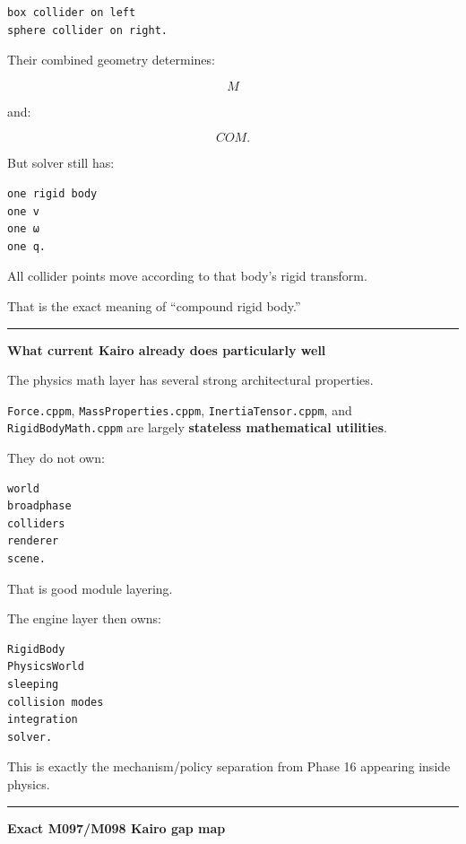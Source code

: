 \begin{verbatim}
box collider on left
sphere collider on right.
\end{verbatim}

Their combined geometry determines:

\[
M
\]

and:

\[
COM.
\]

But solver still has:

\begin{verbatim}
one rigid body
one v
one ω
one q.
\end{verbatim}

All collider points move according to that body's rigid transform.

That is the exact meaning of ``compound rigid body.''

\begin{center}\rule{0.5\linewidth}{0.5pt}\end{center}

\textbf{What current Kairo already does particularly well}

The physics math layer has several strong architectural properties.

\texttt{Force.cppm}, \texttt{MassProperties.cppm}, \texttt{InertiaTensor.cppm}, and \texttt{RigidBodyMath.cppm} are largely \textbf{stateless mathematical utilities}.

They do not own:

\begin{verbatim}
world
broadphase
colliders
renderer
scene.
\end{verbatim}

That is good module layering.

The engine layer then owns:

\begin{verbatim}
RigidBody
PhysicsWorld
sleeping
collision modes
integration
solver.
\end{verbatim}

This is exactly the mechanism/policy separation from Phase 16 appearing inside physics.

\begin{center}\rule{0.5\linewidth}{0.5pt}\end{center}

\textbf{Exact M097/M098 Kairo gap map}

